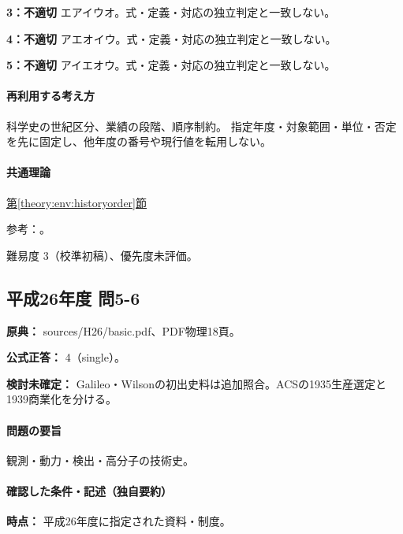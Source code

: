 \noindent\textbf{3：不適切} エアイウオ。式・定義・対応の独立判定と一致しない。\par

\noindent\textbf{4：不適切} アエオイウ。式・定義・対応の独立判定と一致しない。\par

\noindent\textbf{5：不適切} アイエオウ。式・定義・対応の独立判定と一致しない。\par

\paragraph{再利用する考え方} 科学史の世紀区分、業績の段階、順序制約。 指定年度・対象範囲・単位・否定を先に固定し、他年度の番号や現行値を転用しない。

\paragraph{共通理論} \hyperref[theory:env:historyorder]{第\ref*{theory:env:historyorder}節}

\par 参考：\cite{env58_steam}。

\par 難易度 3（校準初稿）、優先度未評価。

\subsection{平成26年度 問5-6}
\label{q:h26-reg-basic-5-6}

\noindent\textbf{原典：} sources/H26/basic.pdf、PDF物理18頁。

\textbf{公式正答：} 4（single）。

\par\textbf{検討未確定：} Galileo・Wilsonの初出史料は追加照合。ACSの1935生産選定と1939商業化を分ける。

\paragraph{問題の要旨} 観測・動力・検出・高分子の技術史。

\paragraph{確認した条件・記述（独自要約）}\mbox{}\par

\noindent\textbf{時点：} 平成26年度に指定された資料・制度。\par

